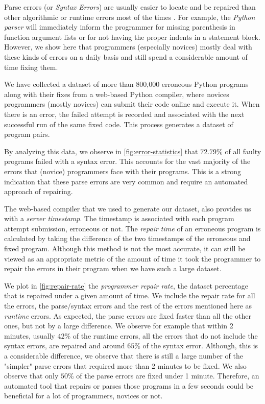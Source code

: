 Parse errors (or \emph{Syntax Errors}) are usually easier to locate and be
repaired than other algorithmic or runtime errors most of the times
\citep{Denny_2012}. For example, the \emph{Python parser} will immediately
inform the programmer for missing parenthesis in function argument lists or for
not having the proper indents in a statement block. However, we show here that
programmers (especially novices) mostly deal with these kinds of errors on a
daily basis and still spend a considerable amount of time fixing them.

We have collected a dataset of more than 800,000 erroneous Python programs along
with their fixes from a web-based Python compiler, where novices programmers
(mostly novices) can submit their code online and execute it. When there is an
error, the failed attempt is recorded and associated with the next successful
run of the same fixed code. This process generates a dataset of program pairs.

By analyzing this data, we observe in \autoref{fig:error-statistics} that $72.79
\% $ of all faulty programs failed with a syntax error. This accounts for the
vast majority of the errors that (novice) programmers face with their programs.
This is a strong indication that these parse errors are very common and require
an automated approach of repairing.

 The web-based compiler that we used to generate our
dataset, also provides us with a \emph{server timestamp}. The timestamp is
associated with each program attempt submission, erroneous or not. The
\emph{repair time} of an erroneous program is calculated by taking the
difference of the two timestamps of the erroneous and fixed program. Although
this method is not the most accurate, it can still be viewed as an appropriate
metric of the amount of time it took the programmer to repair the errors in
their program when we have such a large dataset.

We plot in \autoref{fig:repair-rate} the \emph{programmer repair rate}, \ie the
dataset percentage that is repaired under a given amount of time. We include the
repair rate for all the errors, the parse/syntax errors and the rest of the
errors mentioned here as \emph{runtime} errors. As expected, the parse errors
are fixed faster than all the other ones, but not by a large difference. We
observe for example that within 2 minutes, usually $42 \%$ of the runtime
errors, \ie all the errors that do not include the syntax errors, are repaired
and around $65 \%$ of the syntax error. Although, this is a considerable
difference, we observe that there is still a large number of the "simpler" parse
errors that required more than 2 minutes to be fixed. We also observe that only
$50 \%$ of the parse errors are fixed under 1 minute. Therefore, an automated
tool that repairs or parses those programs in a few seconds could be beneficial
for a lot of programmers, novices or not.

